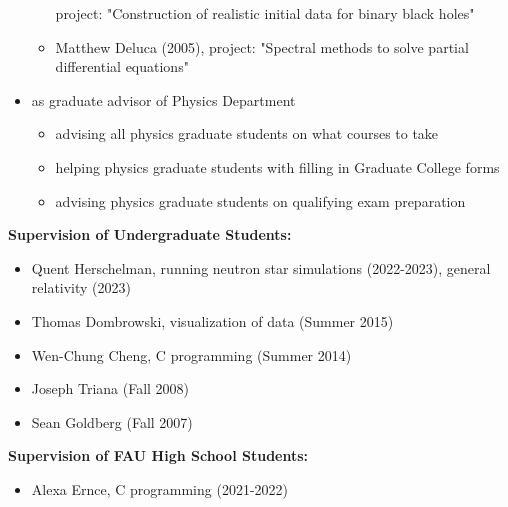 \documentclass[11pt]{article}
\begin{document}
\begin{itemize}
\begin{itemize}
		project:
		"Construction of realistic initial data for binary black holes"
	\item	Matthew Deluca (2005), 
		project:
		"Spectral methods to solve partial differential equations"
	\end{itemize}
\item	as graduate advisor of Physics Department
	\begin{itemize}
	\item	advising all physics graduate students on what courses to take
	\item	helping physics graduate students with filling in
		Graduate College forms
	\item	advising physics graduate students on qualifying exam preparation
	\end{itemize}
\end{itemize}

\medskip

{\bf Supervision of Undergraduate Students:}

\begin{itemize}
\item	Quent Herschelman, running neutron star simulations (2022-2023),
	general relativity (2023) %
\item	Thomas Dombrowski, visualization of data (Summer 2015)
\item	Wen-Chung Cheng, C programming (Summer 2014)
\item	Joseph Triana (Fall 2008)
\item	Sean Goldberg (Fall 2007)
\end{itemize}

\medskip

{\bf Supervision of FAU High School Students:}

\begin{itemize}
\item	Alexa Ernce, C programming (2021-2022)
\end{itemize}
\end{document}
